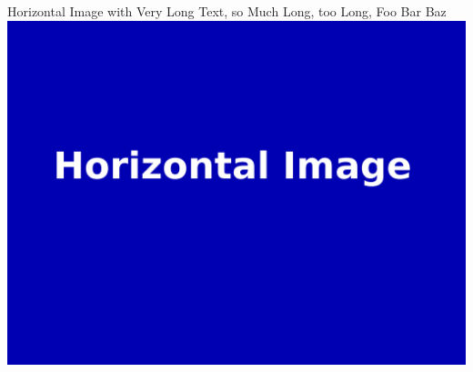 \documentclass{beamer}
\begin{document}
	\begin{frame}{Horizontal Image with Very Long Text, so Much Long, too Long, Foo Bar Baz}
		\hfill\includegraphics[width=0.81\paperwidth]{horizontal.png}\hspace*{\fill}
	\end{frame}
	
\end{document}
